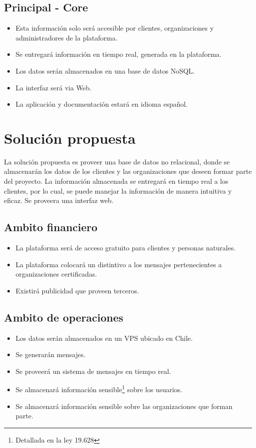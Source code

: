 \documentclass[letterpaper,openright,10pt,oneside]{report}
\begin{document}
					\subsection{Principal - Core}
						\begin{itemize}
							\item Esta información solo será accesible por clientes, organizaciones y administradores de la plataforma.
							\item Se entregará información en tiempo real, generada en la plataforma.
							\item Los datos serán almacenados en una base de datos NoSQL.
							\item La interfaz será via Web.
							\item La aplicación y documentación estará en idioma español.
						\end{itemize}
				\section{Solución propuesta}
				La solución propuesta es proveer una base de datos no relacional, donde se almacenarán los datos de los clientes y las organizaciones que deseen formar parte del proyecto. La información almacenada se entregará en tiempo real a los clientes, por lo cual, se puede manejar la información de manera intuitiva y eficaz. Se proveera una interfaz web.
					\subsection{Ambito financiero}
						\begin{itemize}
							\item La plataforma será de acceso gratuito para clientes y personas naturales.
							\item La plataforma colocará un distintivo a los mensajes pertenecientes a organizaciones certificadas.
							\item Existirá publicidad que proveen terceros.
						\end{itemize}
					\subsection{Ambito de operaciones}
						\begin{itemize}
							\item Los datos serán almacenados en un VPS ubicado en Chile.
							\item Se generarán mensajes.
							\item Se proveerá un sistema de mensajes en tiempo real.
							\item Se almacenará información sensible\footnote{Detallada en la ley 19.628} sobre los usuarios.
							\item Se almacenará información sensible sobre las organizaciones que forman parte. 
						\end{itemize}
\end{document}
